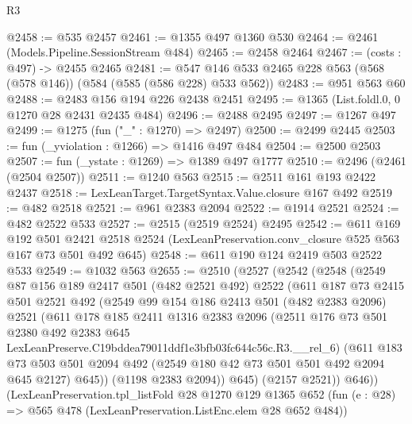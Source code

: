 \begin{lexlean}{R3}
\begin{coremodule}
@2458 := @535 @2457
@2461 := @1355 @497 @1360 @530
@2464 := @2461 (Models.Pipeline.SessionStream @484)
@2465 := @2458 @2464
@2467 := (costs : @497) -> @2455 @2465
@2481 := @547 @146 @533 @2465 @228 @563 (@568 (@578 @146)) (@584 (@585 (@586 @228) @533 @562))
@2483 := @951 @563 @60
@2488 := @2483 @156 @194 @226 @2438 @2451
@2495 := @1365 (List.foldl.{0, 0} @1270 @28 @2431 @2435 @484)
@2496 := @2488 @2495
@2497 := @1267 @497
@2499 := @1275 (fun ("_" : @1270) => @2497)
@2500 := @2499 @2445
@2503 := fun (_yviolation : @1266) => @1416 @497 @484
@2504 := @2500 @2503
@2507 := fun (_ystate : @1269) => @1389 @497 @1777
@2510 := @2496 (@2461 (@2504 @2507))
@2511 := @1240 @563
@2515 := @2511 @161 @193 @2422 @2437
@2518 := LexLeanTarget.TargetSyntax.Value.closure @167 @492
@2519 := @482 @2518
@2521 := @961 @2383 @2094
@2522 := @1914 @2521
@2524 := @482 @2522 @533
@2527 := @2515 (@2519 @2524) @2495
@2542 := @611
    @169
    @192
    @501
    @2421
    @2518
    @2524
    (LexLeanPreservation.conv_closure @525 @563 @167 @73 @501 @492 @645)
@2548 := @611 @190 @124 @2419 @503 @2522 @533
@2549 := @1032 @563
@2655 := @2510
    (@2527
      (@2542
        (@2548
          (@2549
            @87
            @156
            @189
            @2417
            @501
            (@482 @2521 @492)
            @2522
            (@611
              @187
              @73
              @2415
              @501
              @2521
              @492
              (@2549
                @99
                @154
                @186
                @2413
                @501
                (@482 @2383 @2096)
                @2521
                (@611
                  @178
                  @185
                  @2411
                  @1316
                  @2383
                  @2096
                  (@2511
                    @176
                    @73
                    @501
                    @2380
                    @492
                    @2383
                    @645
                    LexLeanPreserve.C19bddea79011ddf1e3bfb03fc644c56c.R3.__rel_6)
                  (@611
                    @183
                    @73
                    @503
                    @501
                    @2094
                    @492
                    (@2549 @180 @42 @73 @501 @501 @492 @2094 @645 @2127)
                    @645))
                (@1198 @2383 @2094))
              @645)
            (@2157 @2521))
          @646))
      (LexLeanPreservation.tpl_listFold
        @28
        @1270
        @129
        @1365
        @652
        (fun (e : @28) => @565 @478 (LexLeanPreservation.ListEnc.elem @28 @652 @484))

\end{coremodule}
\end{lexlean}
